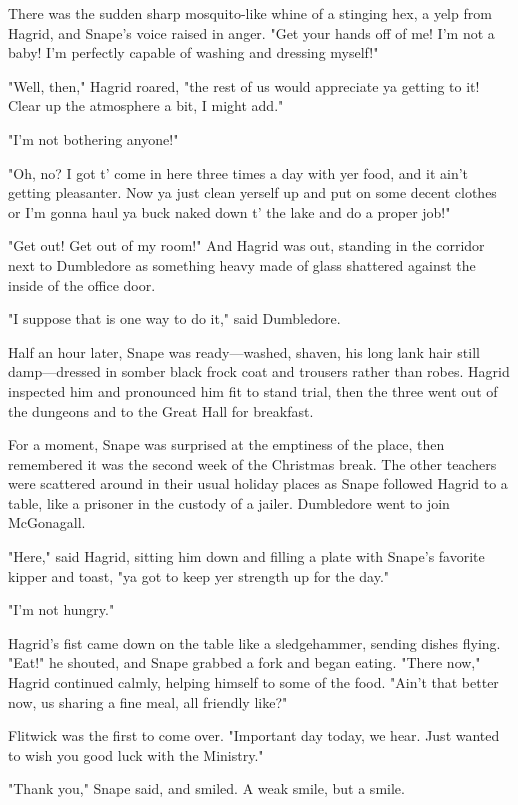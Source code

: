 There was the sudden sharp mosquito-like whine of a stinging hex, a yelp from Hagrid, and Snape's voice raised in anger. "Get your hands off of me! I'm not a baby! I'm perfectly capable of washing and dressing myself!"

"Well, then," Hagrid roared, "the rest of us would appreciate ya getting to it! Clear up the atmosphere a bit, I might add."

"I'm not bothering anyone!"

"Oh, no? I got t' come in here three times a day with yer food, and it ain't getting pleasanter. Now ya just clean yerself up and put on some decent clothes or I'm gonna haul ya buck naked down t' the lake and do a proper job!"

"Get out! Get out of my room!" And Hagrid was out, standing in the corridor next to Dumbledore as something heavy made of glass shattered against the inside of the office door.

"I suppose that is one way to do it," said Dumbledore.

Half an hour later, Snape was ready—washed, shaven, his long lank hair still damp—dressed in somber black frock coat and trousers rather than robes. Hagrid inspected him and pronounced him fit to stand trial, then the three went out of the dungeons and to the Great Hall for breakfast.

For a moment, Snape was surprised at the emptiness of the place, then remembered it was the second week of the Christmas break. The other teachers were scattered around in their usual holiday places as Snape followed Hagrid to a table, like a prisoner in the custody of a jailer. Dumbledore went to join McGonagall.

"Here," said Hagrid, sitting him down and filling a plate with Snape's favorite kipper and toast, "ya got to keep yer strength up for the day."

"I'm not hungry."

Hagrid's fist came down on the table like a sledgehammer, sending dishes flying. "Eat!" he shouted, and Snape grabbed a fork and began eating. "There now," Hagrid continued calmly, helping himself to some of the food. "Ain't that better now, us sharing a fine meal, all friendly like?"

Flitwick was the first to come over. "Important day today, we hear. Just wanted to wish you good luck with the Ministry."

"Thank you," Snape said, and smiled. A weak smile, but a smile.

